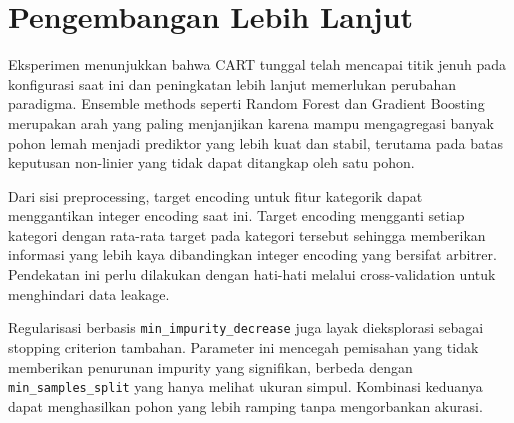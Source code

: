 \documentclass{article}
\begin{document}
\section{Pengembangan Lebih Lanjut}

Eksperimen menunjukkan bahwa CART tunggal telah mencapai titik jenuh pada konfigurasi saat ini dan peningkatan lebih lanjut memerlukan perubahan paradigma. Ensemble methods seperti Random Forest dan Gradient Boosting merupakan arah yang paling menjanjikan karena mampu mengagregasi banyak pohon lemah menjadi prediktor yang lebih kuat dan stabil, terutama pada batas keputusan non-linier yang tidak dapat ditangkap oleh satu pohon.

Dari sisi preprocessing, target encoding untuk fitur kategorik dapat menggantikan integer encoding saat ini. Target encoding mengganti setiap kategori dengan rata-rata target pada kategori tersebut sehingga memberikan informasi yang lebih kaya dibandingkan integer encoding yang bersifat arbitrer. Pendekatan ini perlu dilakukan dengan hati-hati melalui cross-validation untuk menghindari data leakage.

Regularisasi berbasis \texttt{min\_impurity\_decrease} juga layak dieksplorasi sebagai stopping criterion tambahan. Parameter ini mencegah pemisahan yang tidak memberikan penurunan impurity yang signifikan, berbeda dengan \texttt{min\_samples\_split} yang hanya melihat ukuran simpul. Kombinasi keduanya dapat menghasilkan pohon yang lebih ramping tanpa mengorbankan akurasi.
\end{document}

